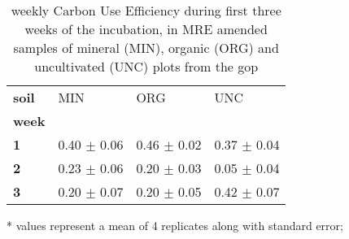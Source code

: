 \begin{table}[H]
\centering
\caption{weekly Carbon Use Efficiency during first three weeks of the incubation, in MRE amended samples of mineral (MIN), organic (ORG) and uncultivated (UNC) plots from the \gls{gop}}
\label{cue_treated_main}

\begin{threeparttable}


\begin{tabular}{llll}
\toprule
\textbf{soil} &           MIN &           ORG &           UNC \\
\textbf{week} &               &               &               \\
\midrule
\textbf{1   } &  0.40 $ \pm $  0.06 &  0.46 $ \pm $  0.02 &  0.37 $ \pm $  0.04 \\
\textbf{2   } &  0.23 $ \pm $  0.06 &  0.20 $ \pm $  0.03 &  0.05 $ \pm $  0.04 \\
\textbf{3   } &  0.20 $ \pm $  0.07 &  0.20 $ \pm $  0.05 &  0.42 $ \pm $  0.07 \\
\bottomrule
\end{tabular}

\begin{tablenotes}
	\item[*] \scriptsize values represent a mean of 4 replicates along with standard error;
\end{tablenotes}

\end{threeparttable}

\end{table}
